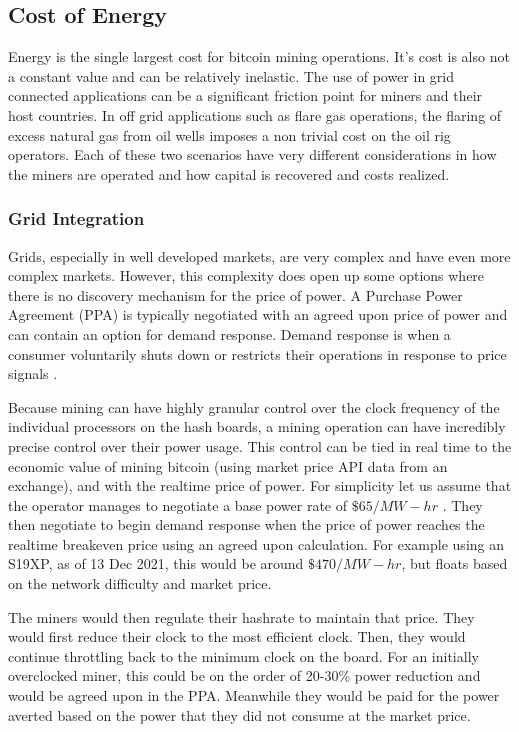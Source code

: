 \documentclass[runningheads]{llncs}
\begin{document}
\subsection{Cost of Energy}
Energy is the single largest cost for bitcoin mining operations.
It's cost is also not a constant value and can be relatively inelastic.
The use of power in grid connected applications can be a significant friction point for miners and their host countries.
In off grid applications such as flare gas operations, the flaring of excess natural gas from oil wells imposes a non trivial cost on the oil rig operators.
Each of these two scenarios have very different considerations in how the miners are operated and how capital is recovered and costs realized.

\subsubsection{Grid Integration}
Grids, especially in well developed markets, are very complex and have even more complex markets.
However, this complexity does open up some options where there is no discovery mechanism for the price of power.
A Purchase Power Agreement (PPA) is typically negotiated with an agreed upon price of power and can contain an option for demand response.
Demand response is when a consumer voluntarily shuts down or restricts their operations in response to price signals \cite{iea2021demand}.

Because mining can have highly granular control over the clock frequency of the individual processors on the hash boards, a mining operation can have incredibly precise control over their power usage.
This control can be tied in real time to the economic value of mining bitcoin (using market price API data from an exchange), and with the realtime price of power.
For simplicity let us assume that the operator manages to negotiate a base power rate of $\$65/MW-hr$ \cite{eia2021elect}.
They then negotiate to begin demand response when the price of power reaches the realtime breakeven price using an agreed upon calculation.
For example using an S19XP, as of 13 Dec 2021, this would be around $\$470/MW-hr$, but floats based on the network difficulty and market price.

The miners would then regulate their hashrate to maintain that price.
They would first reduce their clock to the most efficient clock.
Then, they would continue throttling back to the minimum clock on the board.
For an initially overclocked miner, this could be on the order of 20-30\% power reduction and would be agreed upon in the PPA.
Meanwhile they would be paid for the power averted based on the power that they did not consume at the market price.
\end{document}
